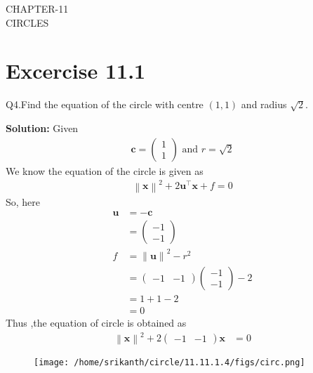 \documentclass[12pt]{article}
\providecommand{\norm}[1]{\left\lVert#1\right\rVert}
\newcommand{\solution}{\noindent \textbf{Solution: }}
\newcommand{\myvec}[1]{\ensuremath{\begin{pmatrix}#1\end{pmatrix}}}
\let\vec\mathbf
\begin{document}
\begin{center}
\textbf\large{CHAPTER-11 \\ CIRCLES}

\end{center}
\section*{Excercise 11.1}

Q4.Find the equation of the circle with centre $(1,1)$ and radius $\sqrt{2}$.

\solution
Given
\begin{align}
	\vec{c} = \myvec{1\\1} \text{ and } r = \sqrt{2}
\end{align}
We know the equation of the circle is given as
\begin{align}
	\norm{\vec{x}}^{2} + 2\vec{u}^{\top}\vec{x} + f = 0
\end{align}
So, here
\begin{align}
\vec{u}&=\vec{-c}\\
	 &= \myvec{-1\\-1}\\
	f &= \norm{\vec{u}}^2 - r^2\\
	  &= \myvec{-1&-1}\myvec{-1\\-1}-2\\
	  &=1+1-2\\
	  &=0	  
\end{align}
Thus ,the equation of circle is obtained as
\begin{align}
	\norm{\vec{x}}^2 +2\myvec{-1&-1}\vec{x}&= 0       		       
\end{align}	
\begin{figure}[!h]
	\begin{center} 
	  \texttt{[image: /home/srikanth/circle/11.11.1.4/figs/circ.png]}
	\end{center}
\caption{}
\label{fig:Fig1}
\end{figure}
\end{document}
